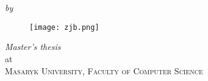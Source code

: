 \begin{titlepage}
  \vspace*{5cm}
  \makeatletter
  \begin{center}
    \begin{Huge}
      \@title
    \end{Huge}\\[0.1cm]
    \begin{Large}
      \@subtitle
    \end{Large}\\
    \emph{by}\\
    \@author
    \begin{figure}[h]
      \centering
      \texttt{[image: zjb.png]}
    \end{figure}

    \vfill
    \emph{Master's thesis}\\
    at\\
    \textsc{Masaryk University, Faculty of Computer Science}
  \end{center}
  \makeatother
\end{titlepage}

\newpage
\null
\thispagestyle{empty}
\newpage
